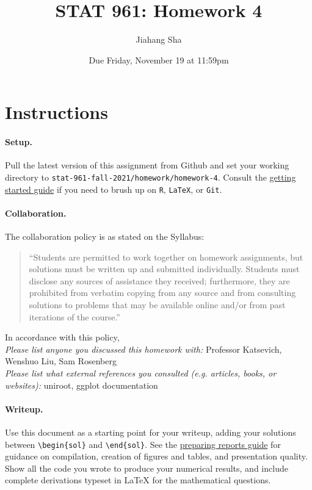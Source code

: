 \documentclass[11pt,letterpaper,english,oneside]{article}\usepackage[]{graphicx}\usepackage[]{color}
\author{Jiahang Sha}
\title{STAT 961: Homework 4}
\date{Due Friday, November 19 at 11:59pm}
\theoremstyle{definition} %
\newtheorem{solution}{Solution}
\newenvironment{sol}{\begin{solution}\hspace{0pt}}{\end{solution}}
\begin{document}
\maketitle

\section{Instructions}

\paragraph{Setup.} Pull the latest version of this assignment from Github and set your working directory to \texttt{stat-961-fall-2021/homework/homework-4}. Consult the \href{https://github.com/Katsevich-Teaching/stat-961-fall-2021/blob/main/getting-started/getting-started.pdf}{getting started guide} if you need to brush up on \texttt{R}, \texttt{LaTeX}, or \texttt{Git}.

\paragraph{Collaboration.} The collaboration policy is as stated on the Syllabus:

\begin{quote}
``Students are permitted to work together on homework assignments, but solutions must be written up and submitted individually. Students must disclose any sources of assistance they received; furthermore, they are prohibited from verbatim copying from any source and from consulting solutions to problems that may be available online and/or from past iterations of the course.''
\end{quote}

\noindent In accordance with this policy, \\

\noindent \textit{Please list anyone you discussed this homework with:} Professor Katsevich, Wenshuo Liu, Sam Rosenberg\\

\noindent \textit{Please list what external references you consulted (e.g. articles, books, or websites):} uniroot, ggplot documentation\\

\paragraph{Writeup.} Use this document as a starting point for your writeup, adding your solutions between \verb|\begin{sol}| and \verb|\end{sol}|. See the \href{https://github.com/Katsevich-Teaching/stat-961-fall-2021/blob/main/getting-started/preparing-reports.pdf}{preparing reports guide} for guidance on compilation, creation of figures and tables, and presentation quality. Show all the code you wrote to produce your numerical results, and include complete derivations typeset in LaTeX for the mathematical questions. 
\end{document}
